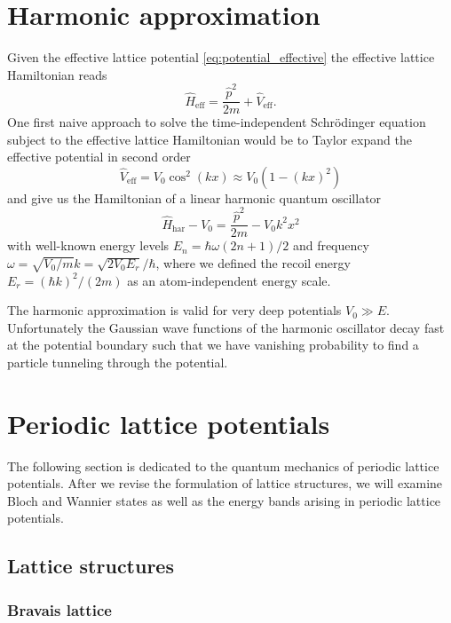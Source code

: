 \section{Harmonic approximation}

Given the effective lattice potential \cref{eq:potential_effective} the
effective lattice Hamiltonian reads
\begin{equation}
  \hat{H}_\text{eff}
  =\frac{\hat{p}^2}{2m}+\hat{V}_\text{eff}
  \label{eq:hamiltonian_effective}.
\end{equation}
One first naive approach to solve the time-independent Schrödinger equation
subject to the effective lattice Hamiltonian would be to Taylor expand
the effective potential in second order
\begin{equation}
  \hat{V}_\text{eff}
  =V_0\cos^2(kx)
  \approx V_0\left(1-(kx)^2\right)
  \label{eq:potential_harmonic_approximation}
\end{equation}
and give us the Hamiltonian of a linear harmonic quantum oscillator
\begin{equation}
  \hat{H}_\text{har}-V_0
  =\frac{\hat{p}^2}{2m}-V_0k^2x^2
  \label{eq:hamiltonian_harmonic_approximation}
\end{equation}
with well-known energy levels $E_n=\hbar\omega(2n+1)/2$ and frequency
$\omega=\sqrt{V_0/m}k=\sqrt{2V_0E_r}/\hbar$, where we defined the recoil
energy $E_r=(\hbar k)^2/(2m)$ as an atom-independent energy scale.

The harmonic approximation is valid for very deep potentials $V_0\gg E$.
Unfortunately the Gaussian wave functions of the harmonic oscillator decay
fast at the potential boundary such that we have vanishing probability to
find a particle tunneling through the potential.

\section{Periodic lattice potentials}

The following section is dedicated to the quantum mechanics of periodic
lattice potentials. After we revise the formulation of lattice structures,
we will examine Bloch and Wannier states as well as the energy bands arising
in periodic lattice potentials.

\subsection{Lattice structures}

\subsubsection{Bravais lattice}

